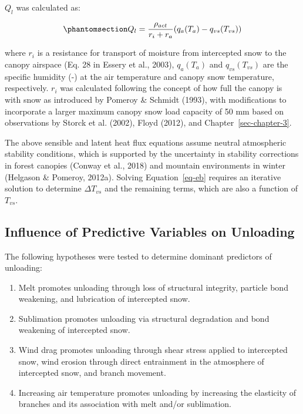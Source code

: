 \documentclass[
  letterpaper,
]{tex/uofsthesis-cs}
\providecommand{\tightlist}{%
  \setlength{\itemsep}{0pt}\setlength{\parskip}{0pt}}
\begin{document}
\(Q_l\) was calculated as:

\begin{equation}\phantomsection\label{eq-ql}{
Q_l = \frac{\rho_{act}}{r_i+r_a} (q_a(T_a) - q_{vs}(T_{vs}))
}\end{equation}

where \(r_i\) is a resistance for transport of moisture from intercepted
snow to the canopy airspace (Eq. 28 in Essery et al., 2003),
\(q_a(T_a)\) and \(q_{vs}(T_{vs})\) are the specific humidity (-) at the
air temperature and canopy snow temperature, respectively. \(r_i\) was
calculated following the concept of how full the canopy is with snow as
introduced by Pomeroy \& Schmidt (1993), with modifications to
incorporate a larger maximum canopy snow load capacity of 50 mm based on
observations by Storck et al. (2002), Floyd (2012), and
Chapter~\ref{sec-chapter-3}.

The above sensible and latent heat flux equations assume neutral
atmospheric stability conditions, which is supported by the uncertainty
in stability corrections in forest canopies (Conway et al., 2018) and
mountain environments in winter (Helgason \& Pomeroy, 2012a). Solving
Equation~\ref{eq-eb} requires an iterative solution to determine
\(\Delta T_{vs}\) and the remaining terms, which are also a function of
\(T_{vs}\).

\subsection{Influence of Predictive Variables on
Unloading}\label{influence-of-predictive-variables-on-unloading}

The following hypotheses were tested to determine dominant predictors of
unloading:

\begin{enumerate}
\def\labelenumi{\alph{enumi}.}
\tightlist
\item
  Melt promotes unloading through loss of structural integrity, particle
  bond weakening, and lubrication of intercepted snow.
\item
  Sublimation promotes unloading via structural degradation and bond
  weakening of intercepted snow.
\item
  Wind drag promotes unloading through shear stress applied to
  intercepted snow, wind erosion through direct entrainment in the
  atmosphere of intercepted snow, and branch movement.
\item
  Increasing air temperature promotes unloading by increasing the
  elasticity of branches and its association with melt and/or
  sublimation.
\end{enumerate}
\end{document}
